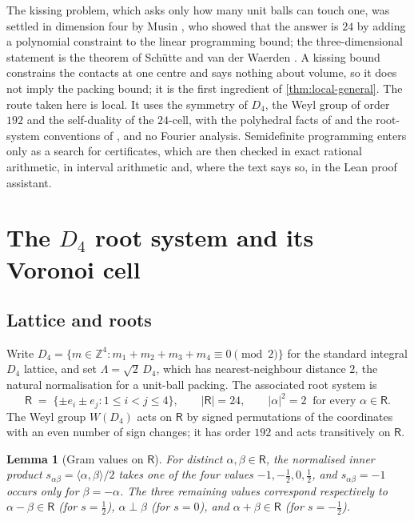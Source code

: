 \documentclass[11pt,reqno]{amsart}
\renewcommand{\_}{\origunderscore\allowbreak}
\numberwithin{equation}{section}
\theoremstyle{plain}
\newtheorem{lem}[thm]{Lemma}
\theoremstyle{definition}
\theoremstyle{remark}
\newcommand{\Rt}{\mathsf{R}}                 %
\newcommand{\Latt}{\Lambda}                  %
\begin{document}
The kissing problem, which asks only how many unit balls can touch one,
was settled in dimension four by Musin \cite{Mus08}, who showed that the
answer is $24$ by adding a polynomial constraint to the linear programming
bound; the three-dimensional statement is the theorem of Sch\"utte and van
der Waerden \cite{SW52}. A kissing bound constrains the contacts at one
centre and says nothing about volume, so it does not imply the packing
bound; it is the first ingredient of \cref{thm:local-general}. The route
taken here is local. It uses the symmetry of $D_4$, the Weyl group of order
$192$ and the self-duality of the $24$-cell, with the polyhedral facts of
\cite{Zie95,Gru03} and the root-system conventions of \cite{Hum90}, and no
Fourier analysis. Semidefinite programming enters only as a search for
certificates, which are then checked in exact rational arithmetic, in
interval arithmetic and, where the text says so, in the Lean proof
assistant.

\section{The \texorpdfstring{$D_4$}{D4} root system and its Voronoi cell}\label{sec:root-system}

\subsection{Lattice and roots}

Write $D_4=\{m\in\mathbb{Z}^4 : m_1+m_2+m_3+m_4\equiv0\pmod2\}$ for the
standard integral $D_4$ lattice, and set $\Latt=\sqrt2\,D_4$, which has
nearest-neighbour distance $2$, the natural normalisation for a
unit-ball packing. The associated root system is
\[
  \Rt \;=\; \{\pm e_i \pm e_j : 1\le i<j\le4\}, \qquad
  |\Rt|=24, \qquad |\alpha|^2=2 \ \text{ for every } \alpha\in\Rt.
\]
The Weyl group $W(D_4)$ acts on $\Rt$ by signed permutations of the
coordinates with an even number of sign changes; it has order $192$ and
acts transitively on $\Rt$.

\begin{lem}[Gram values on $\Rt$]\label{lem:gram-new}
For distinct $\alpha,\beta\in\Rt$, the normalised inner product
$s_{\alpha\beta}=\langle\alpha,\beta\rangle/2$ takes one of the four
values $-1,-\tfrac12,0,\tfrac12$, and $s_{\alpha\beta}=-1$ occurs only
for $\beta=-\alpha$. The three remaining values correspond respectively
to $\alpha-\beta\in\Rt$ (for $s=\tfrac12$), $\alpha\perp\beta$ (for
$s=0$), and $\alpha+\beta\in\Rt$ (for $s=-\tfrac12$).
\end{lem}
\end{document}
